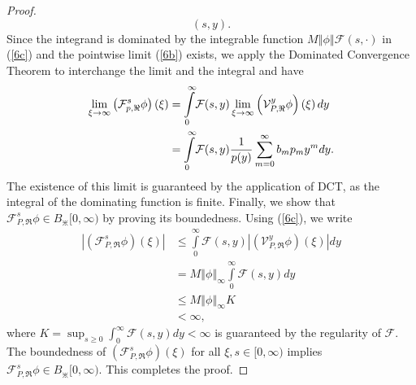 \documentclass[10pt,a4paper]{amsart}
\begin{document}
\begin{proof}
\begin{equation}
(s,y).\label{6c}%
\end{equation}
Since the integrand is dominated by the integrable function $M\left \Vert
\phi \right \Vert \mathcal{F}(s,\cdot)$ in (\ref{6c}) and the pointwise limit
(\ref{6b}) exists, we apply the Dominated Convergence Theorem to interchange
the limit and the integral and have
\begin{align}
\lim_{\xi \rightarrow \infty}\left(  \mathcal{%
\mathcal{F}%
}_{p,\Re}^{s}\phi \right)  (\xi) &  =%
{\displaystyle \int \limits_{0}^{\infty}}
\mathcal{F}%
(s,y)\lim_{\xi \rightarrow \infty}\left(  \mathcal{V}_{P,\Re}^{y}\phi \right)
\left(  \xi \right)  dy\nonumber \\
&  =%
{\displaystyle \int \limits_{0}^{\infty}}
\mathcal{%
\mathcal{F}%
}(s,y)\frac{1}{p(y)}\sum_{m=0}^{\infty}b_{m}p_{m}y^{m}dy.\label{101}%
\end{align}
The existence of this limit is guaranteed by the application of DCT, as the
integral of the dominating function is finite. Finally, we show that
$\mathcal{F}_{P,\Re}^{s}\phi \in B_{\divideontimes}[0,\infty)$ by proving its
boundedness. Using (\ref{6c}), we write
\begin{align*}
\left \vert \left(
\mathcal{F}%
_{P,\Re}^{s}\phi \right)  (\xi)\right \vert  &  \leq%
{\displaystyle \int \limits_{0}^{\infty}}
\mathcal{F}%
(s,y)\left \vert \left(  \mathcal{V}_{P,\Re}^{y}\phi \right)  \left(
\xi \right)  \right \vert dy\\
&  =M\left \Vert \phi \right \Vert _{\infty}%
{\displaystyle \int \limits_{0}^{\infty}}
\mathcal{F}%
(s,y)dy\\
&  \leq M\left \Vert \phi \right \Vert _{\infty}K\\
&  <\infty \text{,}%
\end{align*}
where $K=\displaystyle \sup_{s\geq0}\displaystyle \int_{0}^{\infty}%
\mathcal{F}(s,y)dy<\infty$ is guaranteed by the regularity of $\mathcal{F}$.
The boundedness of $\left(  \mathcal{F}_{P,\Re}^{s}\phi \right)  (\xi)$ for all
$\xi,s\in \lbrack0,\infty)$ implies $\mathcal{F}_{P,\Re}^{s}\phi \in
B_{\divideontimes}[0,\infty)$. This completes the proof.
\end{proof}
\end{document}
